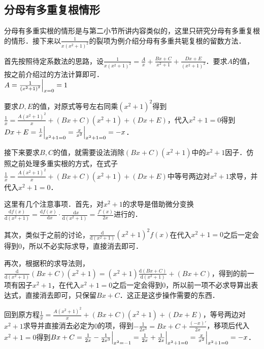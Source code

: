 \documentclass{ctexbook}
\newcommand*{\dif}{\mathop{}\!\mathrm{d}}
\begin{document}
\subsection{分母有多重复根情形}
分母有多重实根的情形是与第二小节所讲内容类似的，这里只研究分母有多重复根的情形．接下来以$\frac{1}{x\left(x^{2}+1\right)^{2}}$的裂项为例介绍分母有多重共轭复根的留数方法．\par
首先按照待定系数法的思路，设$\frac{1}{x\left(x^{2}+1\right)^{2}}=\frac{A}{x}+\frac{Bx+C}{x^{2}+1}+\frac{Dx+E}{\left(x^{2}+1\right)^{2}}$．要求$A$的值，按之前介绍过的方法计算即可．\\
$A=\frac{1}{\left(x^{2}+1\right)^{2}}\Big{|}_{x=0}=1$\par
要求$D,E$的值，对原式等号左右同乘$\left(x^{2}+1\right)^{2}$得到$\frac{1}{x}=\frac{A\left(x^{2}+1\right)^{2}}{x}+\left(Bx+C\right)\left(x^{2}+1\right)+\left(Dx+E\right)$，代入$x^{2}+1=0$得到$Dx+E=\frac{1}{x}\Big{|}_{x^{2}+1=0}=\frac{x}{x^{2}}\Big{|}_{x^{2}+1=0}=-x$．\par
接下来要求$B,C$的值，就需要设法消除$\left(Bx+C\right)\left(x^{2}+1\right)$中的$x^{2}+1$因子．仿照之前处理多重实根的方式，在式子$\frac{1}{x}=\frac{A\left(x^{2}+1\right)^{2}}{x}+\left(Bx+C\right)\left(x^{2}+1\right)+\left(Dx+E\right)$中等号两边对$x^{2}+1$求导，并代入$x^{2}+1=0$．\par
这里有几个注意事项．首先，对$x^{2}+1$的求导是借助微分变换$\frac{\mathrm{d}f\left(x\right)}{\mathrm{d}\left(x^{2}+1\right)}=\frac{\mathrm{d}f\left(x\right)}{\dif{x}}\cdot\frac{\dif{x}}{\mathrm{d}\left(x^{2}+1\right)}=\frac{f'\left(x\right)}{2x}$进行的．\par
其次，类似于之前的讨论，$\frac{\mathrm{d}}{\mathrm{d}\left(x^{2}+1\right)}\left(x^{2}+1\right)^{2}f\left(x\right)$在代入$x^{2}+1=0$之后一定会得到$0$，所以不必实际求导，直接消去即可．\par
再次，根据积的求导法则，$\frac{\mathrm{d}}{\mathrm{d}\left(x^{2}+1\right)}\left(Bx+C\right)\left(x^{2}+1\right)=\left(x^{2}+1\right)\frac{\mathrm{d}\left(Bx+C\right)}{\mathrm{d}\left(x^{2}+1\right)}+\left(Bx+C\right)$，得到的前一项有因子$x^{2}+1$，在代入$x^{2}+1=0$之后一定会得到$0$，所以前一项不必求导算出表达式，直接消去即可，只保留$Bx+C$．这正是这步操作需要的东西．\par
回到原方程$\frac{1}{x}=\frac{A\left(x^{2}+1\right)^{2}}{x}+\left(Bx+C\right)\left(x^{2}+1\right)+\left(Dx+E\right)$，等号两边对$x^{2}+1$求导并直接消去必定为$0$的项，得到$-\frac{1}{2x^{3}}=Bx+C+\frac{\left(-x\right)'}{2x}$，移项后代入$x^{2}+1=0$得到$Bx+C=\frac{1}{2x}-\frac{1}{2x^{3}}\Big{|}_{x^{2}=-1}=\frac{1}{2x}+\frac{1}{2x}\Big{|}_{x^{2}+1=0}=\frac{x}{x^{2}}\Big{|}_{x^{2}+1=0}=-x$．
\end{document}
